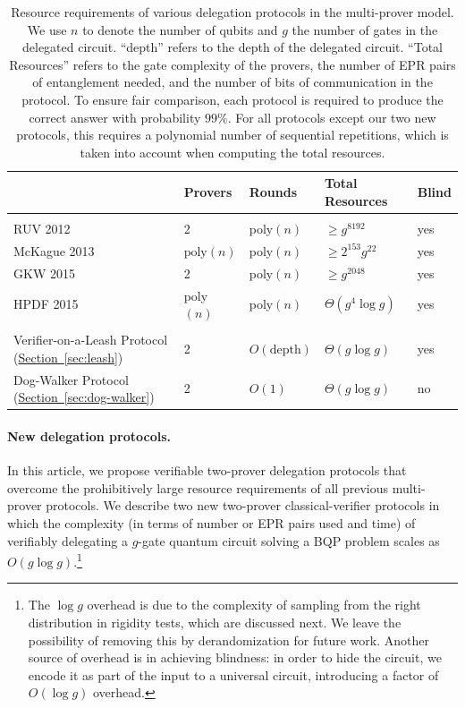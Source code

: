 \documentclass[11pt]{article}
\numberwithin{equation}{section}
\theoremstyle{definition}
\theoremstyle{plain}
\newcommand{\expref}[2]{\hyperref[#2]{#1~\ref{#2}}}
\begin{document}
\begin{table}[t]
\centering
\begin{tabular}{l|llll}
& Provers & Rounds & Total Resources & Blind\\
\hline\\[-8pt]
RUV 2012 \cite{reichardt2012classical}  &2 & poly$(n)$ & $\geq g^{8192}$ & yes\\[3pt]
McKague 2013 \cite{McKague16} &  $\mathrm{poly}(n)$ & poly$(n)$ & $\geq 2^{153}g^{22}$ & yes \\[3pt]
GKW 2015 \cite{Gheorghiu15} &  2 & poly$(n)$ & $\geq g^{2048}$ & yes \\[3pt]
HPDF 2015 \cite{hajdusek2015} &  poly$(n)$& poly$(n)$ & $\Theta(g^4\log g)$ & yes \\[3pt]
\hline\\[-8pt]
Verifier-on-a-Leash Protocol (\expref{Section}{sec:leash})   & 
2 & $O(\mbox{depth})$  & $\Theta(g\log g)$ & yes \\[3pt]
Dog-Walker Protocol (\expref{Section}{sec:dog-walker})  & 2 & $O(1)$ & $\Theta(g\log g)$ & no 
\end{tabular}
\caption{Resource requirements of various delegation protocols in the multi-prover model. 
We use $n$ to denote the number of qubits and $g$ the number of gates in the
  delegated circuit. ``depth'' refers to the depth of the delegated circuit. ``Total Resources'' refers to the gate complexity of the
  provers, the number of EPR pairs of entanglement needed, and the number of
  bits of communication in the protocol. To ensure fair comparison, 
  each protocol is required to produce the correct answer with probability $99\%$.
  For all protocols except our two new protocols, this requires a
  polynomial number of sequential repetitions, which is taken into account when
  computing the total resources. }
\label{tab:comparison}
\end{table}

\paragraph{New delegation protocols.} In this %
article,  %
we propose verifiable two-prover delegation protocols that overcome the prohibitively large resource requirements of all previous multi-prover protocols. We describe two new two-prover classical-verifier protocols in which the complexity (in terms of number or EPR pairs used and time) of verifiably
delegating a $g$-gate quantum circuit solving a BQP problem scales as $O(g\log g)$.\footnote{The $\log
g$ overhead is due to the complexity of sampling from the right distribution in
rigidity tests, which are discussed next. We leave the possibility of removing this by derandomization for
future work. Another source of overhead is in achieving blindness: in order to
hide the circuit, we encode it as part of the input to a universal circuit,
introducing a factor of $O(\log g)$ overhead.} 
\end{document}
